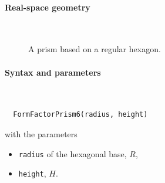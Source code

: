  \label{SPrism6}

\paragraph{Real-space geometry}\strut\\

\begin{figure}[H]
\hfill
{}
\hfill
{}
\hfill
{}
\hfill
\caption{A prism based on a regular hexagon.}
\end{figure}

\FloatBarrier

\paragraph{Syntax and parameters}\strut\\[-2ex plus .2ex minus .2ex]
\begin{lstlisting}
  FormFactorPrism6(radius, height)
\end{lstlisting}
with the parameters
\begin{itemize}
\item \texttt{radius} of the hexagonal base, $R$,
\item \texttt{height}, $H$.
\end{itemize}

